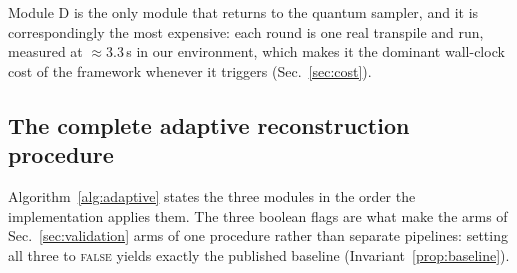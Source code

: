 \documentclass[final,5p,times,longtitle]{elsarticle}
\begin{document}
Module D is the only module that returns to the quantum sampler, and it
is correspondingly the most expensive: each round is one real transpile
and run, measured at ${\approx}3.3$\,s in our environment, which makes it
the dominant wall-clock cost of the framework whenever it triggers
(Sec.~\ref{sec:cost}).

\subsection{The complete adaptive reconstruction procedure}
\label{sec:algorithm}

Algorithm~\ref{alg:adaptive} states the three modules in the order the
implementation applies them. The three boolean flags are what make the
arms of Sec.~\ref{sec:validation} arms of one procedure rather than
separate pipelines: setting all three to \textsc{false} yields exactly
the published baseline (Invariant~\ref{prop:baseline}).
\end{document}
